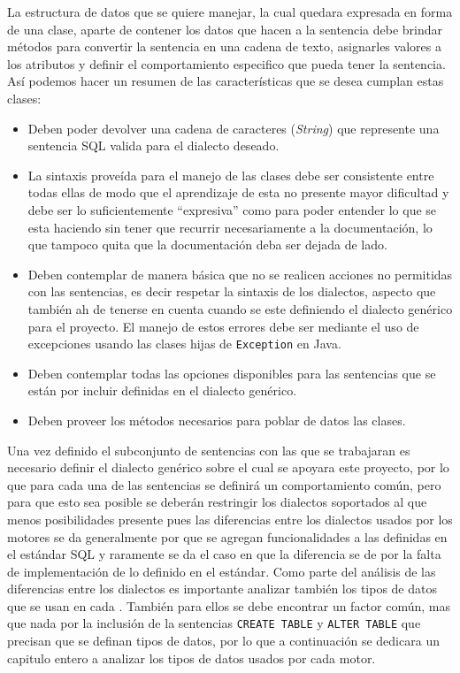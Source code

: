 La estructura de datos que se quiere manejar, la cual quedara expresada en forma de una clase, aparte de contener los datos que hacen a la sentencia debe brindar métodos para convertir la sentencia en una cadena de texto, asignarles valores a los atributos y definir el comportamiento especifico que pueda tener la sentencia. Así podemos hacer un resumen de las características que se desea cumplan estas clases:
\begin{itemize}
%
	\item Deben poder devolver una cadena de caracteres (\textit{String}) que represente una sentencia SQL valida para el dialecto deseado.
	\item La sintaxis proveída para el manejo de las clases debe ser consistente entre todas ellas de modo que el aprendizaje de esta no presente mayor dificultad y debe ser lo suficientemente ``expresiva'' como para poder entender lo que se esta haciendo sin tener que recurrir necesariamente a la documentación, lo que tampoco quita que la documentación deba ser dejada de lado. 
	\item Deben contemplar de manera básica que no se realicen acciones no permitidas con las sentencias, es decir respetar la sintaxis de los dialectos, aspecto que también ah de tenerse en cuenta cuando se este definiendo el dialecto genérico para el proyecto. El manejo de estos errores debe ser mediante el uso de excepciones usando las clases hijas de \verb=Exception= en Java.
	\item Deben contemplar todas las opciones disponibles para las sentencias que se están por incluir definidas en el dialecto genérico.
	\item Deben proveer los métodos necesarios para poblar de datos las clases.
%
\end{itemize}
%
Una vez definido el subconjunto de sentencias con las que se trabajaran es necesario definir el dialecto genérico sobre el cual se apoyara este proyecto, por lo que para cada una de las sentencias se definirá un comportamiento común, pero para que esto sea posible se deberán restringir los dialectos soportados al que menos posibilidades presente pues las diferencias entre los dialectos usados por los motores se da generalmente por que se agregan funcionalidades a las definidas en el estándar  SQL y raramente se da el caso en que la diferencia se de por la falta de implementación de lo definido en el estándar. Como parte del análisis de las diferencias entre los dialectos es importante analizar también los tipos de datos que se usan en cada \dd. También para ellos se debe encontrar un factor común, mas que nada por la inclusión de la sentencias \verb=CREATE TABLE= y \verb=ALTER TABLE= que precisan que se definan tipos de datos, por lo que a continuación se dedicara un capitulo entero a analizar los tipos de datos usados por cada motor.
%
%
